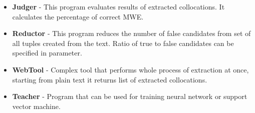 \begin{itemize}
    \item \textbf{Judger} - This program evaluates results of extracted collocations. It calculates the percentage of correct MWE.
 
    \item \textbf{Reductor} - This program reduces the number of false candidates from set of all tuples created from the text. 
    Ratio of true to false candidates can be specified in parameter.
 
    \item \textbf{WebTool} - Complex tool that performs whole process of extraction at once, starting from plain text 
    it returns list of extracted collocations.
 
    \item \textbf{Teacher} - Program that can be used for training neural network or support vector machine.
\end{itemize}


